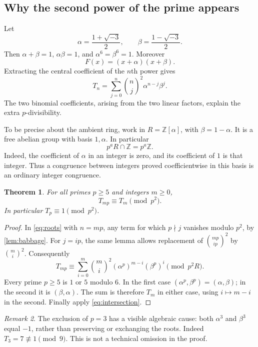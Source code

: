 \documentclass[11pt,a4paper]{article}
\numberwithin{equation}{section}
\newtheorem{theorem}{Theorem}[section]
\theoremstyle{definition}
\theoremstyle{remark}
\newtheorem{remark}[theorem]{Remark}
\newcommand{\Z}{\mathbb Z}
\begin{document}
\subsection{Why the second power of the prime appears}
Let
\[
 \alpha=\frac{1+\sqrt{-3}}2,\qquad
 \beta=\frac{1-\sqrt{-3}}2.
\]
Then $\alpha+\beta=1$, $\alpha\beta=1$, and
$\alpha^6=\beta^6=1$. Moreover
\begin{equation}\label{eq:factor}
 F(x)=(x+\alpha)(x+\beta).
\end{equation}
Extracting the central coefficient of the $n$th power gives
\begin{equation}\label{eq:roots}
 T_n=\sum_{j=0}^n\binom nj^2\alpha^{n-j}\beta^j.
\end{equation}
The two binomial coefficients, arising from the two linear factors,
explain the extra $p$-divisibility.

To be precise about the ambient ring, work in
$R=\Z[\alpha]$, with $\beta=1-\alpha$. It is a free abelian group
with basis $1,\alpha$. In particular
\begin{equation}\label{eq:intersection}
 p^aR\cap\Z=p^a\Z.
\end{equation}
Indeed, the coefficient of $\alpha$ in an integer is zero, and its
coefficient of $1$ is that integer. Thus a congruence between integers
proved coefficientwise in this basis is an ordinary integer congruence.

\begin{theorem}\label{thm:Tp}
For all primes $p\geq5$ and integers $m\geq0$,
\begin{equation}\label{eq:Tp}
 T_{mp}\equiv T_m\pmod{p^2}.
\end{equation}
In particular $T_p\equiv1\pmod{p^2}$.
\end{theorem}
\begin{proof}
In \eqref{eq:roots} with $n=mp$, any term for which $p\nmid j$
vanishes modulo $p^2$, by \cref{lem:babbage}. For $j=ip$, the same
lemma allows replacement of $\binom{mp}{ip}^2$ by $\binom mi^2$.
Consequently
\[
 T_{mp}\equiv\sum_{i=0}^m\binom mi^2
                    (\alpha^p)^{m-i}(\beta^p)^i\pmod{p^2R}.
\]
Every prime $p\geq5$ is $1$ or $5$ modulo $6$. In the first case
$(\alpha^p,\beta^p)=(\alpha,\beta)$; in the second it is
$(\beta,\alpha)$. The sum is therefore $T_m$ in either case, using
$i\mapsto m-i$ in the second. Finally apply \eqref{eq:intersection}.
\end{proof}

\begin{remark}
The exclusion of $p=3$ has a visible algebraic cause: both
$\alpha^3$ and $\beta^3$ equal $-1$, rather than preserving or
exchanging the roots. Indeed $T_3=7\not\equiv1\pmod9$.
This is not a technical omission in the proof.
\end{remark}
\end{document}
